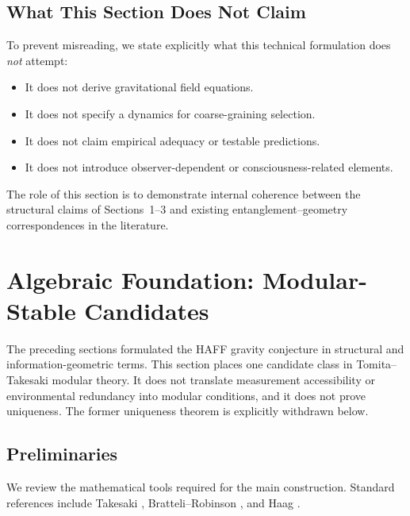 \documentclass[12pt,a4paper,openany]{book}
\begin{document}
\subsection{What This Section Does Not Claim}

To prevent misreading, we state explicitly what this technical formulation does \emph{not} attempt:

\begin{itemize}
    \item It does not derive gravitational field equations.
    \item It does not specify a dynamics for coarse-graining selection.
    \item It does not claim empirical adequacy or testable predictions.
    \item It does not introduce observer-dependent or consciousness-related elements.
\end{itemize}

The role of this section is to demonstrate internal coherence between the structural claims of Sections~1--3 and existing entanglement--geometry correspondences in the literature.


\section{Algebraic Foundation: Modular-Stable Candidates}
\label{D-sec:modular}

The preceding sections formulated the HAFF gravity conjecture in structural and information-geometric terms.  This section places one candidate class in Tomita--Takesaki modular theory.  It does not translate measurement accessibility or environmental redundancy into modular conditions, and it does not prove uniqueness.  The former uniqueness theorem is explicitly withdrawn below.


\subsection{Preliminaries}
\label{D-sec:modular-prelim}

We review the mathematical tools required for the main construction. Standard references include Takesaki \cite{Takesaki2003}, Bratteli--Robinson \cite{BratteliRobinson1997}, and Haag \cite{Haag1996}.
\end{document}
